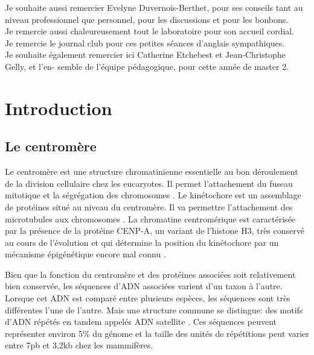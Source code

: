 \documentclass[12pt,a4paper]{article}
\begin{document}
Je souhaite aussi remercier Evelyne Duvernois-Berthet, pour ses conseils tant au niveau professionnel
que personnel, pour les discussions et pour les bonbons.\\

Je remercie aussi chaleureusement tout le laboratoire pour son accueil cordial.\\

Je remercie le journal club pour ces petites séances d'anglais sympathiques.\\

Je souhaite également remercier ici Catherine Etchebest et Jean-Christophe Gelly, et l’en-
semble de l’équipe pédagogique, pour cette année de master 2.\\

\thispagestyle{empty}

\newpage
\tableofcontents
\setcounter{page}{0}
\thispagestyle{empty}
\newpage 

\section{Introduction}
\subsection{Le centromère}
Le centromère est une structure chromatinienne essentielle au bon déroulement de la division cellulaire chez les eucaryotes. Il permet l'attachement du fuseau mitotique et la ségrégation des chromosomes \cite{Cleveland2003}.  Le kinétochore est un assemblage de protéines situé au niveau du centromère.  Il va permettre l'attachement des  microtubules aux chromosomes \cite{Santaguida2009}. La chromatine centromérique est caractérisée par la présence de la protéine CENP-A, un variant de l'histone H3, très conservé au cours de l'évolution et qui détermine la position du kinétochore par un mécanisme épigénétique encore mal connu \cite{Sullivan1994}.

Bien que la fonction du centromère et des protéines associées soit relativement bien conservée, les séquences d'ADN associées varient d'un taxon à l'autre. Lorsque cet ADN est comparé entre plusieurs espèces, les séquences sont très différentes l'une de l'autre. Mais une structure commune se distingue: des motifs d'ADN répétés en tandem appelés ADN satellite \cite{Henikoff2001}. Ces séquences peuvent représenter environ 5\% du génome et la taille des unités de répétitions peut varier entre 7pb et 3,2kb \cite{Giannuzzi2012} chez les mammifères.
\end{document}
